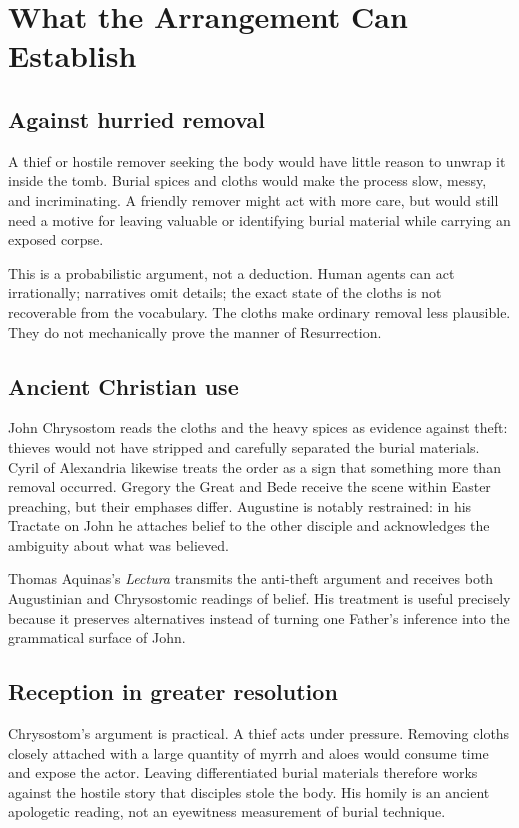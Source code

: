 \section{What the Arrangement Can Establish}

\subsection{Against hurried removal}

A thief or hostile remover seeking the body would have little reason to unwrap
it inside the tomb. Burial spices and cloths would make the process slow,
messy, and incriminating. A friendly remover might act with more care, but would
still need a motive for leaving valuable or identifying burial material while
carrying an exposed corpse.

This is a probabilistic argument, not a deduction. Human agents can act
irrationally; narratives omit details; the exact state of the cloths is not
recoverable from the vocabulary. The cloths make ordinary removal less
plausible. They do not mechanically prove the manner of Resurrection.

\subsection{Ancient Christian use}

John Chrysostom reads the cloths and the heavy spices as evidence against
theft: thieves would not have stripped and carefully separated the burial
materials. Cyril of Alexandria likewise treats the order as a sign that
something more than removal occurred. Gregory the Great and Bede receive the
scene within Easter preaching, but their emphases differ. Augustine is notably
restrained: in his Tractate on John he attaches belief to the other disciple
and acknowledges the ambiguity about what was believed.

Thomas Aquinas's \emph{Lectura} transmits the anti-theft argument and receives
both Augustinian and Chrysostomic readings of belief. His treatment is useful
precisely because it preserves alternatives instead of turning one Father's
inference into the grammatical surface of John.

\subsection{Reception in greater resolution}

Chrysostom's argument is practical. A thief acts under pressure. Removing
cloths closely attached with a large quantity of myrrh and aloes would consume
time and expose the actor. Leaving differentiated burial materials therefore
works against the hostile story that disciples stole the body. His homily is an
ancient apologetic reading, not an eyewitness measurement of burial technique.

